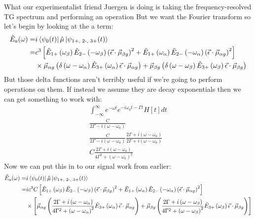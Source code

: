 What our experimentalist friend Juergen is doing is taking the frequency-resolved TG spectrum and performing an operation But we want the Fourier transform so let's begin by looking at the a term:
\begin{align*}
	\tilde{E}_a (\omega) =&  i \bra{\psi_{0} (t)} \hat{\mu} \ket{\psi_{\text{1+, 2-, 3+}} (t)} \\
	=& c^3 \left[ \tilde{E}_{1+} \left( \omega_{\beta} \right) \tilde{E}_{2-} \left( -\omega_{\beta} \right) \left( \vec{\epsilon} \cdot \vec{\mu}_{\beta g} \right)^2 + \tilde{E}_{1+} \left( \omega_{\alpha} \right) \tilde{E}_{2-} \left( -\omega_{\alpha} \right) \left( \vec{\epsilon} \cdot \vec{\mu}_{\alpha g} \right)^2 \right] \\
	&\times \vec{\mu}_{\alpha g}   \left(  \delta \left(  \omega - \omega_{\alpha}\right)\tilde{E}_{3+} \left( \omega_{\alpha} \right) \vec{\epsilon} \cdot \vec{\mu}_{\alpha g} \right) + \vec{\mu}_{\beta g} \left(  \delta \left(  \omega - \omega_{\beta}\right) \tilde{E}_{3+} \left(  \omega_{\beta} \right) \vec{\epsilon} \cdot \vec{\mu}_{\beta g} \right)
\end{align*}
But those delta functions aren't terribly useful if we're going to perform operations on them.  If instead we assume they are decay exponentials then we can get something to work with:
\begin{align*}
	\int_{-\infty}^{\infty} e^{-\omega t}e^{-i \omega_{q} t - \Gamma t} H[t]dt \\
	\frac{C}{2 \Gamma - i \left( \omega - \omega_a\right)} \\
	\frac{C}{2 \Gamma - i \left( \omega - \omega_a\right)}\frac{2 \Gamma + i \left( \omega - \omega_a\right)}{2 \Gamma + i \left( \omega - \omega_a\right)} \\
	C\frac{2 \Gamma + i \left( \omega - \omega_a\right)}{4 \Gamma^2 +  \left( \omega - \omega_a\right)^2}
\end{align*}
Now we can put this in to our signal work from earlier:
\begin{align*}
	\tilde{E}_a (\omega) =&  i \bra{\psi_{0} (t)} \hat{\mu} \ket{\psi_{\text{1+, 2-, 3+}} (t)} \\
	=& ic^3 C \left[ \tilde{E}_{1+} \left( \omega_{\beta} \right) \tilde{E}_{2-} \left( -\omega_{\beta} \right) \left( \vec{\epsilon} \cdot \vec{\mu}_{\beta g} \right)^2 + \tilde{E}_{1+} \left( \omega_{\alpha} \right) \tilde{E}_{2-} \left( -\omega_{\alpha} \right) \left( \vec{\epsilon} \cdot \vec{\mu}_{\alpha g} \right)^2 \right] \\
	&\times \left[\vec{\mu}_{\alpha g}   \left( \frac{2 \Gamma + i \left( \omega - \omega_{\alpha}\right)}{4 \Gamma^2 +  \left( \omega - \omega_{\alpha}\right)^2}\tilde{E}_{3+} \left( \omega_{\alpha} \right) \vec{\epsilon} \cdot \vec{\mu}_{\alpha g} \right) + \vec{\mu}_{\beta g} \left(  \frac{2 \Gamma + i \left( \omega - \omega_{\beta}\right)}{4 \Gamma^2 +  \left( \omega - \omega_{\beta}\right)^2}  \tilde{E}_{3+} \left(  \omega_{\beta} \right) \vec{\epsilon} \cdot \vec{\mu}_{\beta g} \right) \right]
\end{align*}
